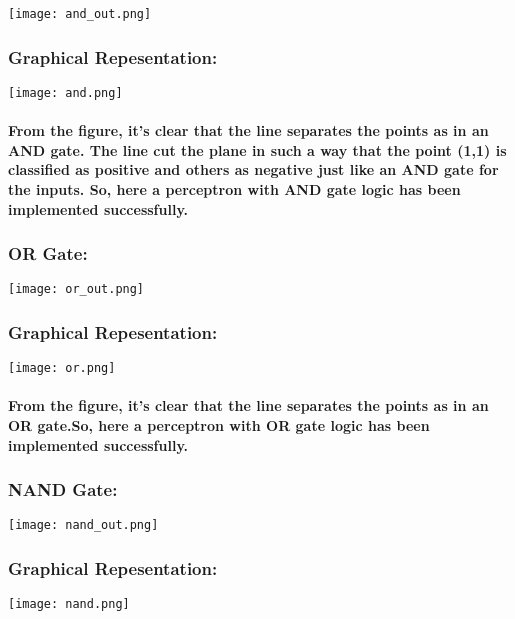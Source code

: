 \documentclass{report}
\begin{document}
\begin{sloppypar}
\texttt{[image: and\_out.png]}
\vspace{5mm}
\subsubsection {Graphical Repesentation:}
\vspace{5mm}
\texttt{[image: and.png]}
\paragraph{From the figure, it's clear that the line separates the points as in an AND gate. The line cut the plane in such a way that the point (1,1) is classified as positive and others as negative just like an AND gate for the inputs. So, here a perceptron with AND gate logic has been implemented successfully. }
\vspace{5mm}

\subsubsection{OR Gate:}
\vspace{5mm}
\texttt{[image: or\_out.png]}
\vspace{5mm}
\subsubsection {Graphical Repesentation:}
\vspace{5mm}
\texttt{[image: or.png]}
\vspace{5mm}
\paragraph{From the figure, it's clear that the line separates the points as in an OR gate.So, here a perceptron with OR gate logic has been implemented successfully. }
\vspace{5mm}

\subsubsection{NAND Gate:}
\vspace{15mm}
\texttt{[image: nand\_out.png]}
\vspace{15mm}
\subsubsection {Graphical Repesentation:}
\vspace{15mm}
\texttt{[image: nand.png]}

\end{sloppypar}
\end{document}
